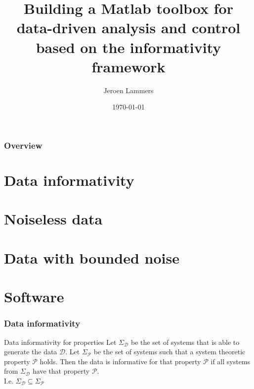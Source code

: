 \documentclass{beamer}
\title[Bachelor’s Project]{Building a Matlab toolbox for data-driven analysis and control based on the informativity framework} %
\author{Jeroen Lammers} %
\institute[RUG] %
{
	\textit{First supervisor: Prof.dr. M.K. Camlibel} \\
	\textit{Second supervisor: Dr. H.J. van Waarde} \\
	\textit{Second assessor: Prof.dr. H.L. Trentelman} \\
	\medskip
}
\date{\today} %
\begin{document}
	
	\begin{frame}
		\titlepage %
	\end{frame}
	
	\begin{frame}
		\frametitle{Overview} %
		\tableofcontents %
	\end{frame}


\section{Data informativity}

\section{Noiseless data}

\section{Data with bounded noise}

\section{Software}


\begin{frame}
	\frametitle{Data informativity}
	\begin{block}{Data informativity for properties}
		Let $\Sigma_\mathcal{D}$ be the set of systems that is able to generate the data $\mathcal{D}$. Let $\Sigma_\mathcal{P}$ be the set of systems such that a system theoretic property $\mathcal{P}$ holds. Then the data is informative for that property $\mathcal{P}$ if all systems from $\Sigma_\mathcal{D}$ have that property $\mathcal{P}$. \\
		I.e. $\Sigma_\mathcal{D} \subseteq \Sigma_\mathcal{P}$
	\end{block}
\end{frame}
\end{document}
